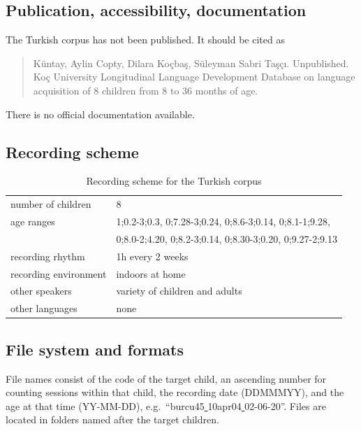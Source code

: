 \documentclass[a4paper, 11pt]{book}
\newcommand{\und}{\underline{{ }}\hspace{0.2mm}}	%
\begin{document}
\subsection{Publication, accessibility, documentation}

The Turkish corpus \citep{Kuntay2015a} has not been published. It should be cited as 

\begin{quote}
	Küntay, Aylin Copty, Dilara Koçbaş, Süleyman Sabri Taşçı. Unpublished. Koç University Longitudinal Language Development Database on language acquisition of 8 children from 8 to 36 months of age. 
\end{quote}

\noindent There is no official documentation available. 

\subsection{Recording scheme}

\begin{table}[ht]
	\centering
	\begin{tabular}{ll}
		\toprule
		number of children 	& 8 \\
		age ranges 			& 1;0.2-3;0.3, 0;7.28-3;0.24, 0;8.6-3;0.14, 0;8.1-1;9.28, \\
							& 0;8.0-2;4.20, 0;8.2-3;0.14, 0;8.30-3;0.20, 0;9.27-2;9.13 \\
		recording rhythm 	& 1h every 2 weeks \\
		recording environment & indoors at home \\
		other speakers 		& variety of children and adults \\
		other languages		& none \\
		\bottomrule
	\end{tabular}
	\caption{Recording scheme for the Turkish corpus}
	\label{tab:Turkish recording scheme}
\end{table}


\subsection{File system and formats}

File names consist of the code of the target child, an ascending number for counting sessions within that child, the recording date (DDMMMYY), and the age at that time (YY-MM-DD), e.g.\ “burcu45\und 10apr04\und 02-06-20”. Files are located in folders named after the target children.
\end{document}
